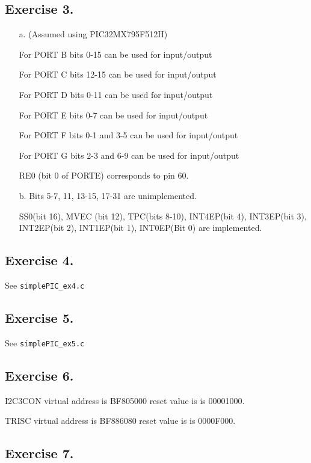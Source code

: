 \documentclass[12pt]{article}
\begin{document}
\subsection*{Exercise 3.}
\begin{itemize}
    \item [a.] 
    (Assumed using PIC32MX795F512H)

    For PORT B bits 0-15 can be used for input/output

    For PORT C bits 12-15 can be used for input/output

    For PORT D bits 0-11 can be used for input/output

    For PORT E bits 0-7 can be used for input/output

    For PORT F bits 0-1 and 3-5 can be used for input/output

    For PORT G bits 2-3 and 6-9 can be used for input/output

    RE0 (bit 0 of PORTE) corresponds to pin 60.

    \item [b.] 
    Bits 5-7, 11, 13-15, 17-31 are unimplemented.

    SS0(bit 16), MVEC (bit 12), TPC(bits 8-10), INT4EP(bit 4), INT3EP(bit 3), INT2EP(bit 2), INT1EP(bit 1), INT0EP(Bit 0) are implemented.

\end{itemize}

\subsection*{Exercise 4.}
See \verb|simplePIC_ex4.c|

\subsection*{Exercise 5.}
See \verb|simplePIC_ex5.c|

\subsection*{Exercise 6.}
I2C3CON virtual address is BF805000 reset value is is 00001000.

TRISC virtual address is BF886080 reset value is is 0000F000.

\subsection*{Exercise 7.}
\end{document}
